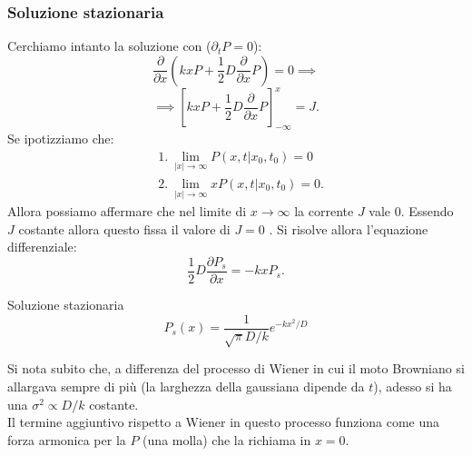 \subsubsection{Soluzione stazionaria}%
\label{subsub:Soluzione stazionaria}
Cerchiamo intanto la soluzione con ($\partial_{t}P=0$):
\[
    \frac{\partial }{\partial x} \left(kxP + \frac{1}{2}D \frac{\partial }{\partial x} P\right) = 0 \implies
\] 
\[
    \implies  \left[kxP + \frac{1}{2}D \frac{\partial }{\partial x} P\right]_{-\infty}^{x} = J
.\] 
Se ipotizziamo che:
\[\begin{aligned}
    & 1. \ \lim_{\left|x\right| \to \infty} P(x, t|x_0,t_0) = 0 \\
    & 2. \ \lim_{\left|x\right| \to \infty} xP(x, t|x_0,t_0) = 0
.\end{aligned}\]
Allora possiamo affermare che nel limite di $x\to\infty$ la corrente $J$ vale $0$. Essendo $J$ costante allora questo fissa il valore di $J = 0$ . Si risolve allora l'equazione differenziale:
\[
    \frac{1}{2}D \frac{\partial P_s}{\partial x} = - kxP_s
.\] 
\begin{bluebox}{Soluzione stazionaria}
    \begin{equation}
	P_s(x) = \frac{1}{\sqrt{\pi} D /k}e^{-kx^2 / D} \label{eq:5_staz}
    \end{equation}
\end{bluebox}
\noindent
Si nota subito che, a differenza del processo di Wiener in cui il moto Browniano si allargava sempre di più (la larghezza della gaussiana dipende da $t$), adesso si ha una $\sigma^2\propto D / k$ costante.\\
Il termine aggiuntivo rispetto a Wiener in questo processo funziona come una forza armonica per la $P$ (una molla) che la richiama in $x = 0$.
